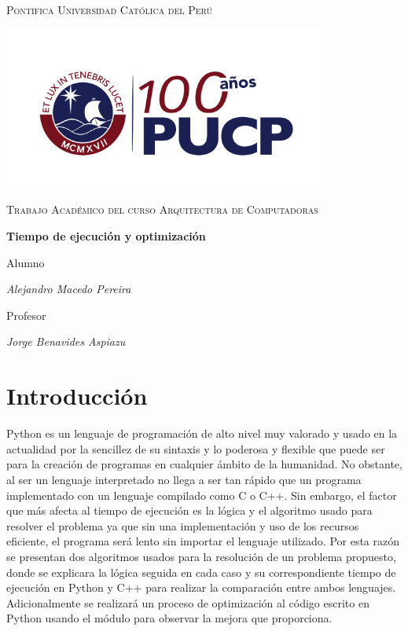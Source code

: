 \documentclass[12pt]{article}
\begin{document}
\begin{titlepage}
   \centering
   {\scshape\LARGE Pontifica Universidad Católica del Perú \par}
   \includegraphics[width=0.8\textwidth]{img/logo}\par
   \vspace{1cm}
   {\scshape\Large Trabajo Académico del curso Arquitectura de Computadoras\par}
   \vspace{1.5cm}
   {\huge\bfseries Tiempo de ejecución y optimización \par}
   \vspace{2cm}
   {\Huge Alumno \par}
   \vspace{0.5cm}
   {\Large\itshape Alejandro Macedo Pereira \par}
   \vspace{2cm}
   {\Huge Profesor \par}
   \vspace{0.5cm}
   {\Large\itshape Jorge Benavides Aspiazu \par}
   \vfill
   {\Large {} \par}
\end{titlepage}

\section{Introducción}
Python es un lenguaje de programación de alto nivel muy valorado y usado en la actualidad por la sencillez de su sintaxis y lo poderosa y flexible que puede ser para la creación
de programas en cualquier ámbito de la humanidad. No obstante, al ser un lenguaje interpretado no llega a ser tan rápido que un programa implementado con un lenguaje compilado
como C o C++. Sin embargo, el factor que más afecta al tiempo de ejecución es la lógica y el algoritmo usado para resolver el problema ya que sin una implementación y uso de los
recursos eficiente, el programa será lento sin importar el lenguaje utilizado. Por esta razón se presentan dos algoritmos usados para la resolución de un problema propuesto, donde
se explicara la lógica seguida en cada caso y su correspondiente tiempo de ejecución en Python y C++ para realizar la comparación entre ambos lenguajes. Adicionalmente se
realizará un proceso de optimización al código escrito en Python usando el módulo para observar la mejora que proporciona.
\end{document}
